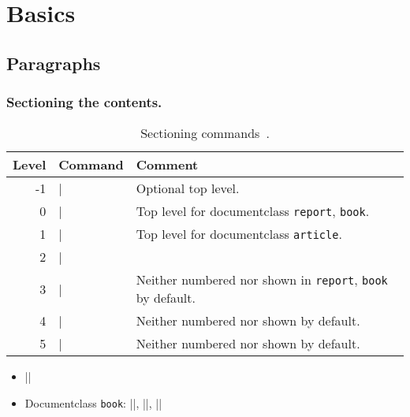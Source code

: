 \documentclass[CJKchecksingle]{beamer}
\newcommand{\pkg}[1]{\texttt{#1}}
\begin{document}
\section{Basics}

\subsection{Paragraphs}

\begin{frame}[fragile]\frametitle{Sectioning the contents.}
\begin{table}[h]
  \centering
  \caption{Sectioning commands~\cite{leoliu}.}
  \begin{tabular}{rlp{}}
    \hline
    Level & Command & Comment \\
    \hline
    -1 & |\part| & Optional top level. \\
    0  & |\chapter| & Top level for documentclass \pkg{report}, \pkg{book}. \\
    1  & |\section| & Top level for documentclass \pkg{article}. \\
    2  & |\subsection| & \\
    3  & |\subsubsection| & Neither numbered nor shown in \pkg{report}, \pkg{book} by default.\\
    4  & |\paragraph| & Neither numbered nor shown by default.\\
    5  & |\subparagraph| & Neither numbered nor shown by default.\\
    \hline
  \end{tabular}
\end{table}

  \begin{itemize}
    \item |\appendix|
    \item Documentclass \pkg{book}: |\frontmatter|, |\mainmatter|,
      |\backmatter|
  \end{itemize}
\end{frame}
\end{document}
